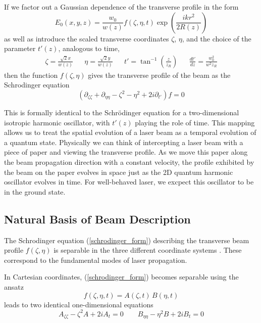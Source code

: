 If we factor out a Gaussian dependence of the transverse profile in the form
\begin{equation}
	E_0(x,y,z) = \frac{w_0}{w(z)} f(\zeta,\eta,t)
	\exp\left(\frac{ik r^2}{2R(z)}\right)
\end{equation}
as well as introduce the scaled transverse coordinates $\zeta$, $\eta$, and the choice of the parameter $t'(z)$, analogous to time,
\begin{align}
	\zeta = \frac{\sqrt{2}x}{w(z)} &&
	\eta = \frac{\sqrt{2}y}{w(z)} && 
	{t'} = \tan^{-1}\left(\frac{z}{z_R}\right) &&
	\frac{d{t'}}{dz} = \frac{w_0^2}{w^2 z_R}
\end{align}
then the function $f(\zeta, \eta)$ gives the transverse profile of the beam as the Schrodinger equation
\begin{equation}
	\label{schrodinger_form}
	\left(
	\partial_{\zeta\zeta} + \partial_{\eta\eta}
	- \zeta^2 - \eta^2 + 2i\partial_{t'}
	\right) f = 0
\end{equation}

This is formally identical to the Schrödinger equation for a two-dimensional isotropic harmonic oscillator, with ${t'}(z)$ playing the role of time. This mapping allows us to treat the spatial evolution of a laser beam as a temporal evolution of a quantum state. Physically we can think of intercepting a laser beam with a piece of paper and viewing the transverse profile. As we move this paper along the beam propagation direction with a constant velocity, the profile exhibited by the beam on the paper evolves in space just as the 2D quantum harmonic oscillator evolves in time. For well-behaved laser, we excpect this oscillator to be in the ground state.

\subsection{Natural Basis of Beam Description}
The Schrodinger equation (\ref{schrodinger_form}) describing the transverse beam profile $f(\zeta, \eta)$ is separable in the three different coordinate systems \cite{schrodinger_2dho_separability}. These correspond to the fundamental modes of laser propagation.

In Cartesian coordinates, (\ref{schrodinger_form}) becomes separable using the ansatz
\begin{equation}
	f(\zeta,\eta,t) = A(\zeta,t)\,B(\eta,t)
\end{equation}
leads to two identical one-dimensional equations
\begin{equation}
	A_{\zeta\zeta} - \zeta^2 A + 2i A_t = 0
	\qquad
	B_{\eta\eta} - \eta^2 B + 2i B_t = 0
\end{equation}

